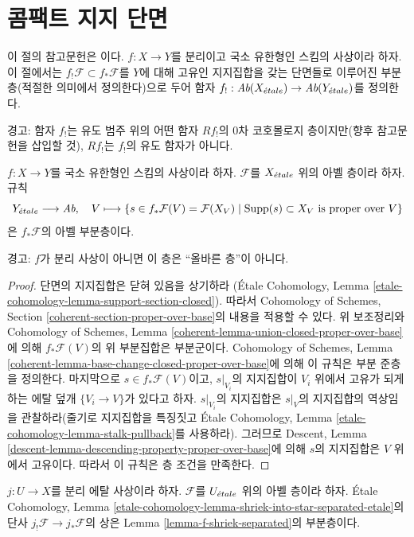 \section{콤팩트 지지 단면}
\label{section-compact-support}

\noindent
이 절의 참고문헌은 \cite[Exposee XVII, Section 6]{SGA4}이다.
$f : X \to Y$를 분리이고 국소 유한형인 스킴의 사상이라 하자. 이 절에서는
$f_!\mathcal{F} \subset f_*\mathcal{F}$를 $Y$에 대해 고유인 지지집합을 갖는
단면들로 이루어진 부분층(적절한 의미에서 정의한다)으로 두어 함자
$f_! : \textit{Ab}(X_{\acute{e}tale}) \to \textit{Ab}(Y_{\acute{e}tale})$를 정의한다.

\medskip\noindent
경고: 함자 $f_!$는 유도 범주 위의 어떤 함자 $Rf_!$의 0차 코호몰로지
층이지만(향후 참고문헌을 삽입할 것), $Rf_!$는 $f_!$의 유도 함자가 아니다.

\begin{lemma}
\label{lemma-f-shriek-separated}
$f : X \to Y$를 국소 유한형인 스킴의 사상이라 하자.
$\mathcal{F}$를 $X_{\acute{e}tale}$ 위의 아벨 층이라 하자. 규칙
$$
Y_{\acute{e}tale} \longrightarrow \textit{Ab},\quad
V \longmapsto \{s \in f_*\mathcal{F}(V) = \mathcal{F}(X_V) \mid
\text{Supp}(s) \subset X_V \text{ is proper over }V\}
$$
은 $f_*\mathcal{F}$의 아벨 부분층이다.
\end{lemma}

\noindent
경고: $f$가 분리 사상이 아니면 이 층은 “올바른 층”이 아니다.

\begin{proof}
단면의 지지집합은 닫혀 있음을 상기하라
(\'Etale Cohomology, Lemma
\ref{etale-cohomology-lemma-support-section-closed}). 따라서
Cohomology of Schemes, Section
\ref{coherent-section-proper-over-base}의 내용을 적용할 수 있다.
위 보조정리와 Cohomology of Schemes, Lemma
\ref{coherent-lemma-union-closed-proper-over-base}에 의해
$f_*\mathcal{F}(V)$의 위 부분집합은 부분군이다.
Cohomology of Schemes, Lemma
\ref{coherent-lemma-base-change-closed-proper-over-base}에 의해 이 규칙은
부분 준층을 정의한다. 마지막으로 $s \in f_*\mathcal{F}(V)$이고,
$s|_{V_i}$의 지지집합이 $V_i$ 위에서 고유가 되게 하는 에탈 덮개
$\{V_i \to V\}$가 있다고 하자. $s|_{V_i}$의 지지집합은 $s|_V$의
지지집합의 역상임을 관찰하라(줄기로 지지집합을 특징짓고
\'Etale Cohomology, Lemma
\ref{etale-cohomology-lemma-stalk-pullback}를 사용하라).
그러므로 Descent, Lemma
\ref{descent-lemma-descending-property-proper-over-base}에 의해
$s$의 지지집합은 $V$ 위에서 고유이다. 따라서 이 규칙은 층 조건을
만족한다.
\end{proof}

\begin{lemma}
\label{lemma-separated-etale-shriek}
$j : U \to X$를 분리 에탈 사상이라 하자. $\mathcal{F}$를
$U_{\acute{e}tale}$ 위의 아벨 층이라 하자. \'Etale Cohomology, Lemma
\ref{etale-cohomology-lemma-shriek-into-star-separated-etale}의 단사
$j_!\mathcal{F} \to j_*\mathcal{F}$의 상은 Lemma
\ref{lemma-f-shriek-separated}의 부분층이다.
\end{lemma}

